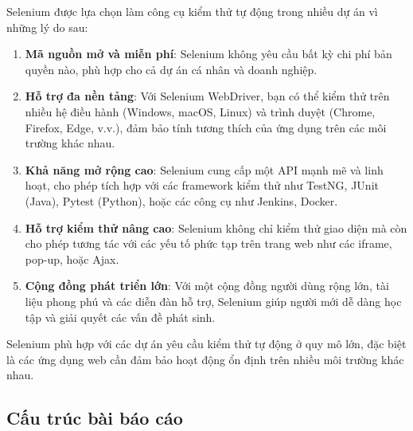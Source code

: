 Selenium được lựa chọn làm công cụ kiểm thử tự động trong nhiều dự án vì những lý do sau:
\begin{enumerate}
    \item \textbf{Mã nguồn mở và miễn phí}: Selenium không yêu cầu bất kỳ chi phí bản quyền nào, phù hợp cho cả dự án cá nhân và doanh nghiệp.
    \item \textbf{Hỗ trợ đa nền tảng}: Với Selenium WebDriver, bạn có thể kiểm thử trên nhiều hệ điều hành (Windows, macOS, Linux) và trình duyệt (Chrome, Firefox, Edge, v.v.), đảm bảo tính tương thích của ứng dụng trên các môi trường khác nhau.
    \item \textbf{Khả năng mở rộng cao}: Selenium cung cấp một API mạnh mẽ và linh hoạt, cho phép tích hợp với các framework kiểm thử như TestNG, JUnit (Java), Pytest (Python), hoặc các công cụ như Jenkins, Docker.
    \item \textbf{Hỗ trợ kiểm thử nâng cao}: Selenium không chỉ kiểm thử giao diện mà còn cho phép tương tác với các yếu tố phức tạp trên trang web như các iframe, pop-up, hoặc Ajax.
    \item \textbf{Cộng đồng phát triển lớn}: Với một cộng đồng người dùng rộng lớn, tài liệu phong phú và các diễn đàn hỗ trợ, Selenium giúp người mới dễ dàng học tập và giải quyết các vấn đề phát sinh.
\end{enumerate}

Selenium phù hợp với các dự án yêu cầu kiểm thử tự động ở quy mô lớn, đặc biệt là các ứng dụng web cần đảm bảo hoạt động ổn định trên nhiều môi trường khác nhau.

\subsection{Cấu trúc bài báo cáo}
